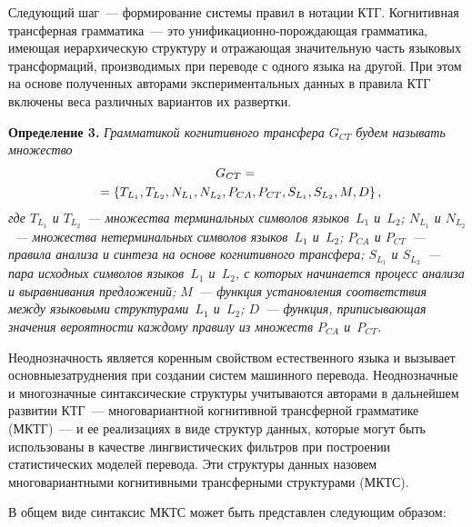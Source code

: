 \begin{multicols}{2}
     Следующий шаг~--- формирование системы правил в нотации КТГ. 
Когнитивная трансферная грамматика~--- это унификационно-порождающая 
грамматика, имеющая иерархическую структуру и отражающая 
значительную часть языковых трансформаций, производимых при переводе с 
одного языка на другой. При этом на основе полученных авторами 
экспериментальных данных в правила КТГ включены веса различных 
вариантов их развертки. 
     
     \medskip
     
     \noindent
     \textbf{Определение 3.} \textit{Грамматикой когнитивного трансфера 
$G_{CT}$ будем называть множество
     \begin{multline*}
     G_{CT} ={}\\
     {}=\{T_{L_1},  T_{L_2}, N_{L_1}, N_{L_2}, P_{CA}, P_{CT}, 
S_{L_1}, S_{L_2}, M, D\}\,,\hspace*{-2.85pt}
     \end{multline*}
где $T_{L_1}$ и $T_{L_2}$~--- множества терминальных символов 
языков~$L_1$ и~$L_2$; $N_{L_1}$ и $N_{L_2}$~--- множества 
нетерминальных символов языков~$L_1$ и~$L_2$; $P_{CA}$ и $P_{CT}$~--- 
правила анализа и синтеза на основе когнитивного трансфера; $S_{L_1}$ и
$S_{L_2}$~--- пара исходных символов языков~$L_1$ и~$L_2$, с которых 
начинается процесс анализа и выравнивания предложений; $M$~--- функция 
уста\-нов\-ле\-ния соответствия между языковыми структурами~$L_1$ и~$L_2$; 
$D$~--- функция, приписывающая значения вероятности каждому правилу из 
множеств $P_{CA}$ и~$P_{CT}$. 
}

\medskip
     
     Неоднозначность является коренным свойством естественного языка и 
вызывает основные\linebreak затруднения при создании систем машинного перево\-да. 
Неоднозначные и многозначные синтаксические структуры учитываются 
авторами в дальнейшем развитии КТГ~--- многовариантной когни\-тив\-ной 
трансферной грамматике (МКТГ)~--- и ее реализациях в виде структур 
данных, которые могут быть использованы в качестве лингвистических 
фильтров при построении статистических моделей перевода. Эти структуры 
данных назовем многовариантными когнитивными трансферными 
структурами (МКТС). 
     
     В общем виде синтаксис МКТС может быть представлен следующим 
образом:
\pagebreak

\end{multicols}


